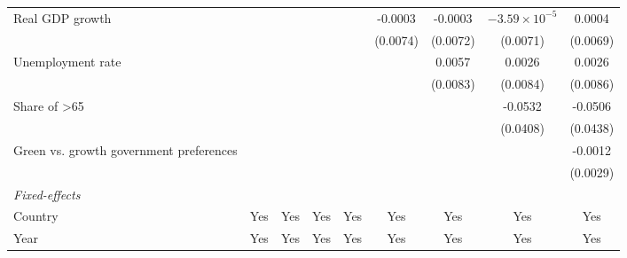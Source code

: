 \begin{table}[htbp]
\begin{tabular}{lcccccccc}
      Real GDP growth                                                          &          &          &                &                 & -0.0003         & -0.0003         & $-3.59\times 10^{-5}$  & 0.0004\\   
                                                                               &          &          &                &                 & (0.0074)        & (0.0072)        & (0.0071)               & (0.0069)\\   
      Unemployment rate                                                        &          &          &                &                 &                 & 0.0057          & 0.0026                 & 0.0026\\   
                                                                               &          &          &                &                 &                 & (0.0083)        & (0.0084)               & (0.0086)\\   
      Share of >65                                                             &          &          &                &                 &                 &                 & -0.0532                & -0.0506\\   
                                                                               &          &          &                &                 &                 &                 & (0.0408)               & (0.0438)\\   
      Green vs. growth government preferences                                  &          &          &                &                 &                 &                 &                        & -0.0012\\   
                                                                               &          &          &                &                 &                 &                 &                        & (0.0029)\\   
      \midrule
      \emph{Fixed-effects}\\
      Country                                                                  & Yes      & Yes      & Yes            & Yes             & Yes             & Yes             & Yes                    & Yes\\  
      Year                                                                     & Yes      & Yes      & Yes            & Yes             & Yes             & Yes             & Yes                    & Yes\\  
      \midrule

\end{tabular}
\end{table}
